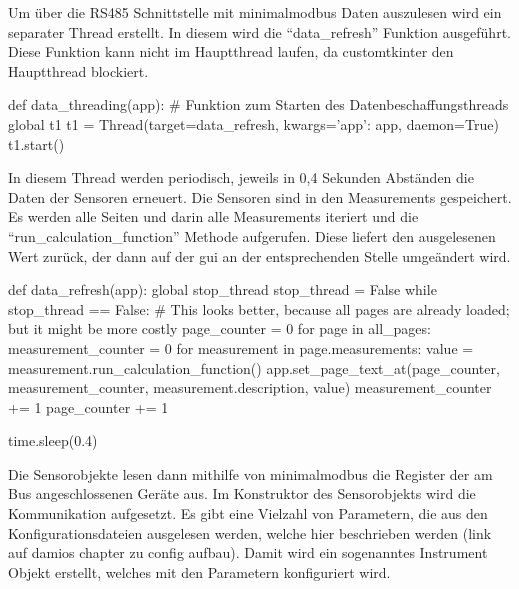 Um über die RS485 Schnittstelle mit minimalmodbus Daten auszulesen wird ein separater Thread erstellt. In diesem wird die \enquote{data\_refresh} Funktion ausgeführt. Diese Funktion kann nicht im Hauptthread laufen, da customtkinter den Hauptthread blockiert.

\begin{pythoncode}
def data_threading(app):
	# Funktion zum Starten des Datenbeschaffungsthreads
	global t1
	t1 = Thread(target=data_refresh, kwargs={'app': app}, daemon=True)
	t1.start()
\end{pythoncode}

In diesem Thread werden periodisch, jeweils in 0,4 Sekunden Abständen die Daten der Sensoren erneuert. Die Sensoren sind in den Measurements gespeichert. Es werden alle Seiten und darin alle Measurements iteriert und die \enquote{run\_calculation\_function} Methode aufgerufen. Diese liefert den ausgelesenen Wert zurück, der dann auf der \acs{gui} an der entsprechenden Stelle umgeändert wird.

\begin{pythoncode}
def data_refresh(app):
	global stop_thread
	stop_thread = False
	while stop_thread == False:
		# This looks better, because all pages are already loaded; but it might be more costly
		page_counter = 0
		for page in all_pages:
			measurement_counter = 0
			for measurement in page.measurements:
				value = measurement.run_calculation_function()
				app.set_page_text_at(page_counter, measurement_counter, measurement.description, value)
				measurement_counter += 1
			page_counter += 1
		
		time.sleep(0.4)
\end{pythoncode}

Die Sensorobjekte lesen dann mithilfe von minimalmodbus die Register der am Bus angeschlossenen Geräte aus. Im Konstruktor des Sensorobjekts wird die Kommunikation aufgesetzt. Es gibt eine Vielzahl von Parametern, die aus den Konfigurationsdateien ausgelesen werden, welche hier beschrieben werden (link auf damios chapter zu config aufbau). Damit wird ein sogenanntes Instrument Objekt erstellt, welches mit den Parametern konfiguriert wird.

